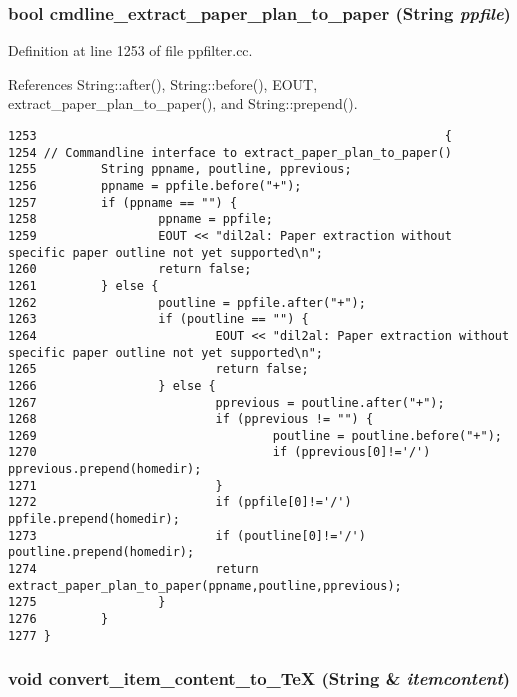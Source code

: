 \subsubsection{\setlength{\rightskip}{0pt plus 5cm}bool cmdline\_\-extract\_\-paper\_\-plan\_\-to\_\-paper ({\bf String} {\em ppfile})}\label{ppfilter_8cc_a29}




Definition at line 1253 of file ppfilter.cc.

References String::after(), String::before(), EOUT, extract\_\-paper\_\-plan\_\-to\_\-paper(), and String::prepend().



\footnotesize\begin{verbatim}1253                                                         {
1254 // Commandline interface to extract_paper_plan_to_paper()
1255         String ppname, poutline, pprevious;
1256         ppname = ppfile.before("+");
1257         if (ppname == "") {
1258                 ppname = ppfile;
1259                 EOUT << "dil2al: Paper extraction without specific paper outline not yet supported\n";
1260                 return false;
1261         } else {
1262                 poutline = ppfile.after("+");
1263                 if (poutline == "") {
1264                         EOUT << "dil2al: Paper extraction without specific paper outline not yet supported\n";
1265                         return false;
1266                 } else {
1267                         pprevious = poutline.after("+");
1268                         if (pprevious != "") {
1269                                 poutline = poutline.before("+");
1270                                 if (pprevious[0]!='/') pprevious.prepend(homedir);
1271                         }
1272                         if (ppfile[0]!='/') ppfile.prepend(homedir);
1273                         if (poutline[0]!='/') poutline.prepend(homedir);
1274                         return extract_paper_plan_to_paper(ppname,poutline,pprevious);
1275                 }
1276         }
1277 }
\end{verbatim}\normalsize 
{}
\subsubsection{\setlength{\rightskip}{0pt plus 5cm}void convert\_\-item\_\-content\_\-to\_\-Te\-X ({\bf String} \& {\em itemcontent})}\label{ppfilter_8cc_a17}




